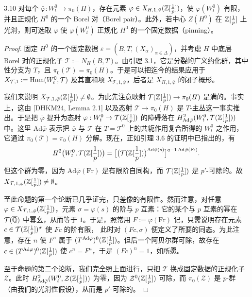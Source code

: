 \begin{prop}{3.10}\label{prop:dat-3-10}
对每个 $\bar\varphi:W^0_t\to\pi_0(H)$，存在元素 $\varphi\in X_{H,1,\bar\varphi}(\mathbb{Z}[\frac1p])$，使 $\varphi(W^0_t)$ 有限，并且正规化 $H^0$ 的一个 Borel 对（Borel pair）。此外，若中心 $Z(H^0)$ 在 $\mathbb{Z}[\frac1p]$ 上光滑，则可选取 $\varphi$ 使 $\varphi(W^0_t)$ 正规化 $H^0$ 的一个固定数据（pinning）。
\end{prop}

\begin{proof}
固定 $H^0$ 的一个固定数据 $\varepsilon=(B,T,(X_\alpha)_{\alpha\in\Delta})$，并考虑 $H$ 中底层 Borel 对的正规化子 $\mathcal T:=N_H(B,T)$。由引理 3.1，它是分裂的广义约化群，其中性分支为 $T$，且 $\pi_0(\mathcal T)=\pi_0(H)$。于是可以把迄今的结果应用于 $X_{\mathcal T,1}:=\operatorname{Hom}(W^0_t,\mathcal T)$ 及其直和项 $X_{\mathcal T,1,\bar\varphi}$，后者是 $X_{H,1,\bar\varphi}$ 的闭子概形。

我们来说明 $X_{\mathcal T,1,\bar\varphi}(\mathbb{Z}[\frac1p])\neq\emptyset$。为此先注意映射 $\mathcal T(\mathbb{Z}[\frac1p])\to\pi_0(H)$ 是满的。事实上，这由 [DHKM24, Lemma 2.1] 以及态射 $\mathcal T\to\pi_0(H)$ 是 $T$-主丛这一事实推出。于是把 $\bar\varphi$ 提升为态射 $\varphi:W^0_t\to\mathcal T(\mathbb{Z}[\frac1p])$ 的障碍落在 $H^2_{\mathrm{Ad}\bar\varphi}(W^0_t,\mathcal T(\mathbb{Z}[\frac1p]))$ 中。这里 $\mathrm{Ad}\bar\varphi$ 表示把 $\bar\varphi$ 与 $\mathcal T$ 在 $T=\mathcal T^0$ 上的共轭作用复合所得的 $W^0_t$ 之作用，它通过 $\pi_0(\mathcal T)=\pi_0(H)$ 分解。现在，正如引理 3.6 的证明中已指出的，有
\[
H^2\bigl(W^0_t,\mathcal T(\mathbb{Z}[\frac1p])\bigr)=\bigl[\bigl(\mathcal T(\mathbb{Z}[\frac1p])\bigr)^{\mathrm{Ad}\bar\varphi(s)}\bigr]^{q-1\,\mathrm{Ad}\bar\varphi(\mathrm{Fr})}.
\]
但这个群为零，因为 $\mathrm{Ad}\bar\varphi(\mathrm{Fr})$ 是有限阶自同构，而 $\mathcal T(\mathbb{Z}[\frac1p])$ 是 $p'$-可除的。故 $X_{\mathcal T,1,\bar\varphi}(\mathbb{Z}[\frac1p])\neq\emptyset$。

至此命题的第一个论断已几乎证完，只差像的有限性。然而注意，对任意 $\varphi\in X_{\mathcal T,1,\bar\varphi}(\mathbb{Z}[\frac1p])$，元素 $\sigma=\varphi(s)$ 的阶与 $p$ 互素：它的某个与 $p$ 互素的幂在 $\mathcal T(\overline{\mathbb{Q}})$ 中幂幺，从而等于 $1$。于是，照常用 $F:=\varphi(\mathrm{Fr})$ 记，只需说明存在元素 $c\in\mathcal T(\mathbb{Z}[\frac1p])^\sigma$ 使 $Fc$ 的阶有限，
此时对 $(Fc,\sigma)$ 便定义了所要的同态。为此注意，存在 $n$ 使 $F^n$ 属于 $(T^{\mathrm{Ad}\bar\varphi})^0(\mathbb{Z}[\frac1p])$。但后一个阿贝尔群可除，故存在 $c\in(T^{\mathrm{Ad}\bar\varphi})^0(\mathbb{Z}[\frac1p])$ 使 $c^n=F^n$，于是 $(Fc)^n=1$，如所愿。

至于命题的第二个论断，我们完全照上面进行，只把 $\mathcal T$ 换成固定数据的正规化子 $\mathcal Z$。此时 $H^2_{\mathrm{Ad}\bar\varphi}(W^0_t,\mathcal Z(\mathbb{Z}[\frac1p]))$ 为零，因为 $\mathcal Z^0(\mathbb{Z}[\frac1p])$ 可除，而 $\pi_0(\mathcal Z)$ 是 $p$-群（由我们的光滑性假设），从而是 $p'$-可除的。
\end{proof}

